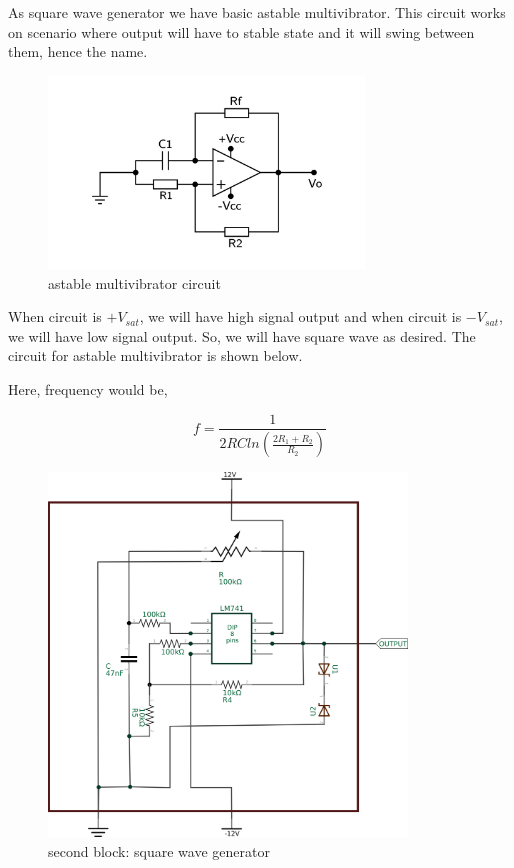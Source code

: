 \documentclass[14pt,a4paper]{extarticle}
\begin{document}
As square wave generator we have basic astable multivibrator. This circuit works on scenario where output will have to stable state and it will swing between them, hence the name.

\begin{figure}[H]
    \centering
    \label{square}
    \includegraphics[width=0.75\textwidth]{imgs/square.png}
    \caption{astable multivibrator circuit}
\end{figure}

When circuit is \(+V_{sat}\), we will have high signal output and when circuit is \(-V_{sat}\), we will have low signal output. So, we will have square wave as desired. The circuit for astable multivibrator is shown below.

Here, frequency would be, 

\begin{equation}
\label{eq:org1a80d97}
  f =\frac{1}{2 RC ln(\frac{2R_{1}+R_{2}}{R_{2}})}
\end{equation}


\begin{figure}[H]
    \centering
    \label{squarereal}
    \includegraphics[width=0.85\textwidth]{imgs/squarereal.png}
    \caption{second block: square wave generator}
\end{figure}
\end{document}

